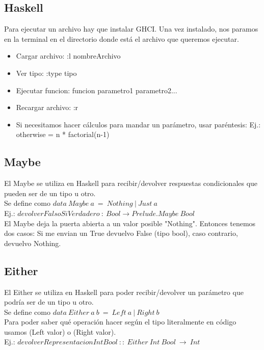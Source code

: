 \documentclass[10pt,a4paper]{article}
\begin{document}
\subsection*{Haskell}
Para ejecutar un archivo hay que instalar GHCI. Una vez instalado, nos paramos en la terminal en el directorio donde está el archivo que queremos ejecutar. 
\begin{itemize}
    \item Cargar archivo: :l nombreArchivo
    \item Ver tipo: :type tipo 
    \item Ejecutar funcion: funcion parametro1 parametro2...
    \item Recargar archivo: :r
    \item Si necesitamos hacer cálculos para mandar un parámetro, usar paréntesis: Ej.: otherwise = n * factorial(n-1)
\end{itemize} 
\subsection*{Maybe}
El Maybe se utiliza en Haskell para recibir/devolver respuestas condicionales que pueden ser de un tipo u otro. \\

Se define como $data \ Maybe \ a \ = \ Nothing \ | \ Just \ a$ \\

Ej.: $ devolverFalsoSiVerdadero \:: \ Bool \rightarrow Prelude.Maybe \ Bool $ \\

El Maybe deja la puerta abierta a un valor posible "Nothing". Entonces tenemos dos casos: Si me envian un True devuelvo False (tipo bool), caso contrario, devuelvo Nothing. 

\subsection*{Either}
El Either se utiliza en Haskell para poder recibir/devolver un parámetro que podría ser de un tipo u otro. \\
Se define como $ data \ Either \ a \ b \ = \ Left \ a \ | \ Right \ b $ \\

Para poder saber qué operación hacer según el tipo literalmente en código usamos (Left valor) o (Right valor). \\

Ej.: $ devolverRepresentacionIntBool \ :: \ Either \ Int \ Bool \ \rightarrow \ Int $ \\
\end{document}
